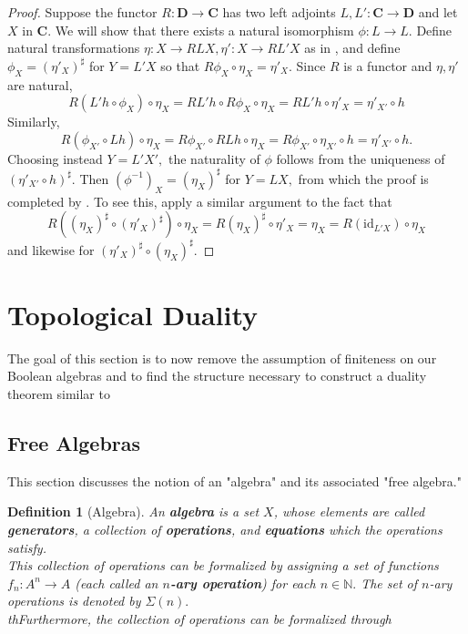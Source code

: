 \documentclass{article}
\newtheorem{definition}[proposition]{Definition}
\numberwithin{equation}{section}
\newcommand{\cat}[1]{{\mathbf{#1}}}
\newcommand{\id}{\mathrm{id}}
\begin{document}
\begin{proof}
Suppose the functor $R : \cat{D} \to \cat{C}$ has two left adjoints $L, L' : \cat{C} \to \cat{D}$ and let $X$ in $\cat C$. We will show that there exists a natural isomorphism $\phi : L \to L.$ Define natural transformations $\eta : X \to RLX, \eta' : X \to RL'X$ as in , and define $\phi_X = (\eta'_X)^\sharp$ for $Y = L'X$ so that $R\phi_X \circ \eta_X = \eta'_X.$ Since $R$ is a functor and $\eta, \eta'$ are natural, $$R(L'h \circ \phi_X) \circ \eta_X = RL'h \circ R\phi_X \circ \eta_X = RL'h \circ \eta'_{X} = \eta'_{X'} \circ h$$ Similarly, $$R(\phi_{X'} \circ Lh) \circ \eta_X = R\phi_{X'} \circ RLh \circ \eta_X = R\phi_{X'} \circ \eta_{X'} \circ h = \eta'_{X'} \circ h.$$ Choosing instead $Y = L'X',$ the naturality of $\phi$ follows from the uniqueness of $(\eta'_{X'} \circ h)^\sharp.$ Then $(\phi^{-1})_X = (\eta_X)^\sharp$ for $Y 
= LX,$ from which the proof is completed by . To see this, apply a similar argument to the fact that $$R((\eta_X)^\sharp \circ (\eta'_X)^\sharp) \circ \eta_X = R(\eta_X)^\sharp \circ \eta'_X = \eta_X = R(\id_{L'X}) \circ \eta_X$$ and likewise for $(\eta'_X)^\sharp \circ (\eta_X)^\sharp.$
\end{proof}

\section{Topological Duality}

The goal of this section is to now remove the assumption of finiteness on our Boolean algebras and to find the structure necessary to construct a duality theorem similar to  

\subsection{Free Algebras}

This section discusses the notion of an "algebra" and its associated "free algebra." 

\begin{definition}[Algebra]
An \textbf{algebra} is a set $X$, whose elements are called \textbf{generators}, a collection of \textbf{operations}, and  \textbf{equations} which the operations satisfy. \\

This collection of operations can be formalized by assigning a set of functions $f_n : A^n \to A$ (each called an \textbf{$n$-ary operation}) for each $n \in \mathbb{N}.$ The set of $n$-ary operations is denoted by $\Sigma(n).$ \\

thFurthermore, the collection of operations can be formalized through 
\end{definition}
\end{document}
